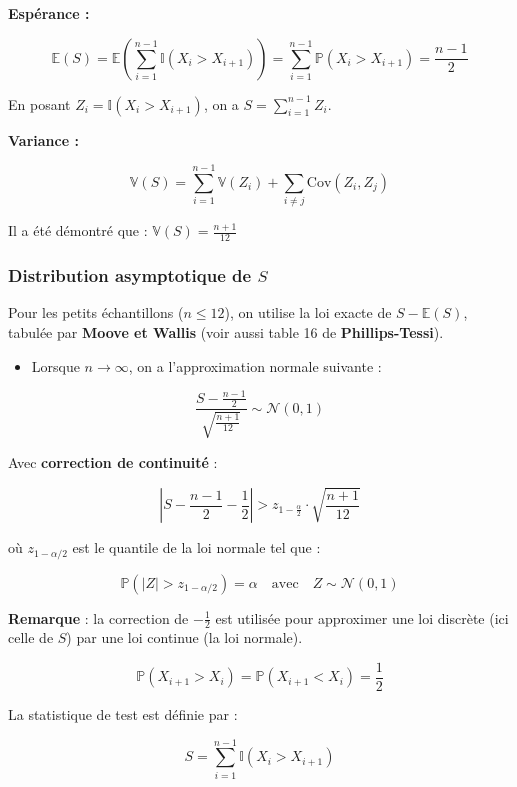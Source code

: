 \documentclass[
  12pt,
]{article}
\providecommand{\tightlist}{%
  \setlength{\itemsep}{0pt}\setlength{\parskip}{0pt}}
\begin{document}
\textbf{Espérance :}

\[
\mathbb{E}(S) = \mathbb{E}\left( \sum_{i=1}^{n-1} \mathbb{I}(X_i > X_{i+1}) \right)
= \sum_{i=1}^{n-1} \mathbb{P}(X_i > X_{i+1}) = \frac{n - 1}{2}
\]

En posant \(Z_i = \mathbb{I}(X_i > X_{i+1})\), on a
\(S = \sum_{i=1}^{n-1} Z_i\).

\textbf{Variance :}

\[
\mathbb{V}(S) = \sum_{i=1}^{n-1} \mathbb{V}(Z_i) + \sum_{i \ne j} \mathrm{Cov}(Z_i, Z_j)
\]

Il a été démontré que : \(\mathbb{V}(S) = \frac{n + 1}{12}\)

\subsubsection{\texorpdfstring{Distribution asymptotique de
\(S\)}{Distribution asymptotique de S}}\label{distribution-asymptotique-de-s}

Pour les petits échantillons (\(n \leq 12\)), on utilise la loi exacte
de \(S - \mathbb{E}(S)\), tabulée par \textbf{Moove et Wallis} (voir
aussi table 16 de \textbf{Phillips-Tessi}).

\begin{itemize}
\tightlist
\item
  Lorsque \(n \to \infty\), on a l'approximation normale suivante :
\end{itemize}

\[
\frac{S - \frac{n - 1}{2}}{\sqrt{ \frac{n + 1}{12} }} \sim \mathcal{N}(0, 1)
\]

Avec \textbf{correction de continuité} :

\[
\left| S - \frac{n - 1}{2} - \frac{1}{2} \right| > z_{1 - \frac{\alpha}{2}} \cdot \sqrt{ \frac{n + 1}{12} }
\]

où \(z_{1 - \alpha/2}\) est le quantile de la loi normale tel que :

\[
\mathbb{P}(|Z| > z_{1 - \alpha/2}) = \alpha \quad \text{avec} \quad Z \sim \mathcal{N}(0, 1)
\]

\textbf{Remarque} : la correction de \(-\frac{1}{2}\) est utilisée pour
approximer une loi discrète (ici celle de \(S\)) par une loi continue
(la loi normale).

\[
\mathbb{P}(X_{i+1} > X_i) = \mathbb{P}(X_{i+1} < X_i) = \frac{1}{2}
\]

La statistique de test est définie par :

\[
S = \sum_{i=1}^{n-1} \mathbb{I}(X_i > X_{i+1})
\]
\end{document}
